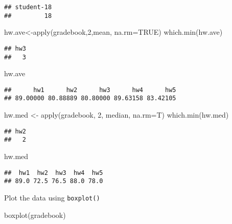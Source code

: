 \documentclass[
]{article}
\newenvironment{Shaded}{\begin{snugshade}}{\end{snugshade}}
\newcommand{\AttributeTok}[1]{\textcolor[rgb]{0.77,0.63,0.00}{#1}}
\newcommand{\ConstantTok}[1]{\textcolor[rgb]{0.00,0.00,0.00}{#1}}
\newcommand{\DecValTok}[1]{\textcolor[rgb]{0.00,0.00,0.81}{#1}}
\newcommand{\FunctionTok}[1]{\textcolor[rgb]{0.00,0.00,0.00}{#1}}
\newcommand{\NormalTok}[1]{#1}
\newcommand{\OtherTok}[1]{\textcolor[rgb]{0.56,0.35,0.01}{#1}}
\begin{document}
\begin{verbatim}
## student-18 
##         18
\end{verbatim}

\begin{Shaded}
\begin{Highlighting}[]
\NormalTok{hw.ave}\OtherTok{\textless{}{-}}\FunctionTok{apply}\NormalTok{(gradebook,}\DecValTok{2}\NormalTok{,mean, }\AttributeTok{na.rm=}\ConstantTok{TRUE}\NormalTok{)}
\FunctionTok{which.min}\NormalTok{(hw.ave)}
\end{Highlighting}
\end{Shaded}

\begin{verbatim}
## hw3 
##   3
\end{verbatim}

\begin{Shaded}
\begin{Highlighting}[]
\NormalTok{hw.ave}
\end{Highlighting}
\end{Shaded}

\begin{verbatim}
##      hw1      hw2      hw3      hw4      hw5 
## 89.00000 80.88889 80.80000 89.63158 83.42105
\end{verbatim}

\begin{Shaded}
\begin{Highlighting}[]
\NormalTok{hw.med }\OtherTok{\textless{}{-}} \FunctionTok{apply}\NormalTok{(gradebook, }\DecValTok{2}\NormalTok{, median, }\AttributeTok{na.rm=}\NormalTok{T)}
\FunctionTok{which.min}\NormalTok{(hw.med)}
\end{Highlighting}
\end{Shaded}

\begin{verbatim}
## hw2 
##   2
\end{verbatim}

\begin{Shaded}
\begin{Highlighting}[]
\NormalTok{hw.med}
\end{Highlighting}
\end{Shaded}

\begin{verbatim}
##  hw1  hw2  hw3  hw4  hw5 
## 89.0 72.5 76.5 88.0 78.0
\end{verbatim}

Plot the data using \texttt{boxplot()}

\begin{Shaded}
\begin{Highlighting}[]
\FunctionTok{boxplot}\NormalTok{(gradebook)}
\end{Highlighting}
\end{Shaded}
\end{document}
